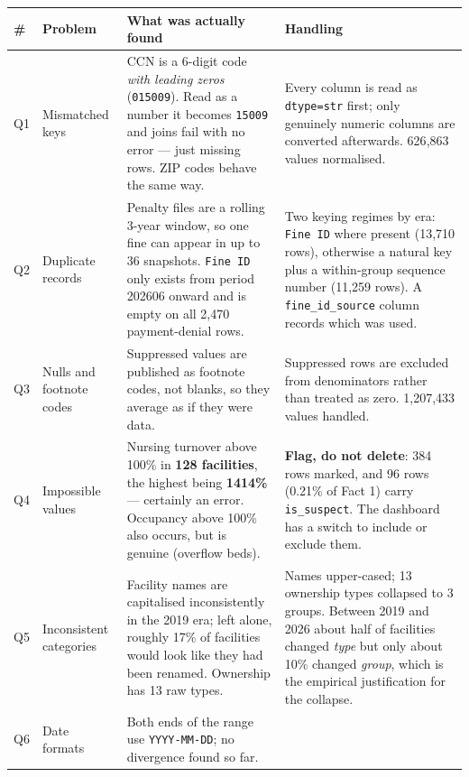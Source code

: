 \documentclass[11pt,a4paper]{article}
\newcommand{\sansall}{\sffamily}
\newcommand{\code}[1]{\texttt{#1}}
\begin{document}
\begin{table}[htbp]\centering
\begin{adjustbox}{max width=\linewidth}
\small
\begin{tabular}{L{0.7cm} L{2.9cm} L{7.3cm} L{6.0cm}}
\toprule
\sansall\bfseries \# & \sansall\bfseries Problem &
\sansall\bfseries What was actually found & \sansall\bfseries Handling \\
\midrule
Q1 & Mismatched keys &
  CCN is a 6-digit code \emph{with leading zeros} (\code{015009}). Read as a
  number it becomes \code{15009} and joins fail with no error — just missing
  rows. ZIP codes behave the same way. &
  Every column is read as \code{dtype=str} first; only genuinely numeric
  columns are converted afterwards. 626{,}863 values normalised. \\
\addlinespace
Q2 & Duplicate records &
  Penalty files are a rolling 3-year window, so one fine can appear in up to 36
  snapshots. \code{Fine ID} only exists from period 202606 onward and is empty
  on all 2{,}470 payment-denial rows. &
  Two keying regimes by era: \code{Fine ID} where present (13{,}710 rows),
  otherwise a natural key plus a within-group sequence number (11{,}259 rows).
  A \code{fine\_id\_source} column records which was used. \\
\addlinespace
Q3 & Nulls and footnote codes &
  Suppressed values are published as footnote codes, not blanks, so they
  average as if they were data. &
  Suppressed rows are excluded from denominators rather than treated as zero.
  1{,}207{,}433 values handled. \\
\addlinespace
Q4 & Impossible values &
  Nursing turnover above 100\% in \textbf{128 facilities}, the highest being
  \textbf{1414\%} — certainly an error. Occupancy above 100\% also occurs, but
  is genuine (overflow beds). &
  \textbf{Flag, do not delete}: 384 rows marked, and 96 rows (0.21\% of Fact 1)
  carry \code{is\_suspect}. The dashboard has a switch to include or exclude
  them. \\
\addlinespace
Q5 & Inconsistent categories &
  Facility names are capitalised inconsistently in the 2019 era; left alone,
  roughly 17\% of facilities would look like they had been renamed. Ownership
  has 13 raw types. &
  Names upper-cased; 13 ownership types collapsed to 3 groups. Between 2019 and
  2026 about half of facilities changed \emph{type} but only about 10\% changed
  \emph{group}, which is the empirical justification for the collapse. \\
\addlinespace
Q6 & Date formats &
  Both ends of the range use \code{YYYY-MM-DD}; no divergence found so far. &

\end{tabular}
\end{adjustbox}
\end{table}
\end{document}
